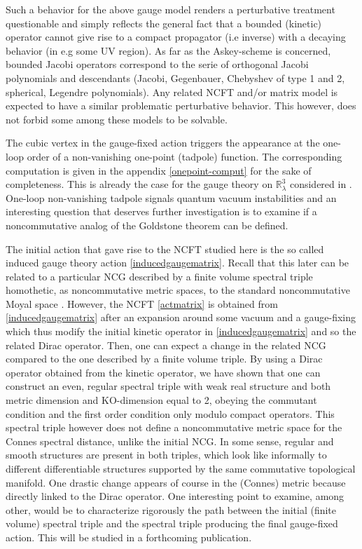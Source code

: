 \documentclass[a4paper,11pt,twoside]{article}
\numberwithin{equation}{section}
\theoremstyle{nonumberplain}
\newcounter{and}
\begin{document}
Such a behavior for the above gauge model renders a perturbative treatment questionable and simply reflects the general fact that a bounded (kinetic) operator cannot give rise to a compact propagator (i.e inverse) with a decaying behavior (in e.g some UV region). As far as the Askey-scheme is concerned, bounded Jacobi operators correspond to the serie of orthogonal Jacobi polynomials and descendants (Jacobi, Gegenbauer, Chebyshev of type 1 and 2, spherical, Legendre polynomials). Any related NCFT and/or matrix model is expected to have a similar problematic perturbative behavior. This however, does not forbid some among these models to be solvable.\par

The cubic vertex in the gauge-fixed action triggers the appearance at the one-loop order of a non-vanishing one-point (tadpole) function. The corresponding computation is given in the appendix \ref{onepoint-comput} for the sake of completeness. This is already the case for the gauge theory on $\mathbb{R}^3_\lambda$ considered in \cite{gvw13}. One-loop non-vanishing tadpole signals quantum vacuum instabilities and an interesting question that deserves further investigation is to examine if a noncommutative analog of the Goldstone theorem can be defined.\par

The initial action that gave rise to the NCFT studied here is the so called induced gauge theory action \eqref{inducedgaugematrix}. Recall that this later can be related to a particular NCG described by a finite volume spectral triple \cite{finite-vol} homothetic, as noncommutative metric spaces, to the standard noncommutative Moyal space \cite{homot-moyal}. However, the NCFT \eqref{actmatrix} is obtained from \eqref{inducedgaugematrix} after an expansion around some vacuum and a gauge-fixing which thus modify the initial kinetic operator in \eqref{inducedgaugematrix} and so the related Dirac operator. Then, one can expect a change in the related NCG compared to the one described by a finite volume triple. By using a Dirac operator obtained from the kinetic operator, we have shown that one can construct an even, regular spectral triple with weak real structure and both metric dimension and KO-dimension equal to 2, obeying the commutant condition and the first order condition only modulo compact operators. 
This spectral triple however does not define a noncommutative metric space for the Connes spectral distance, unlike the initial NCG. In some sense, regular and smooth structures are present in both triples, which look like informally to different differentiable structures supported by the same commutative topological manifold. One drastic change appears of course in the (Connes) metric because directly linked to the Dirac operator. One interesting point to examine, among other, would be to characterize rigorously the path between the initial (finite volume) spectral triple and the spectral triple producing the final gauge-fixed action. This will be studied in a forthcoming publication.\par
\end{document}
